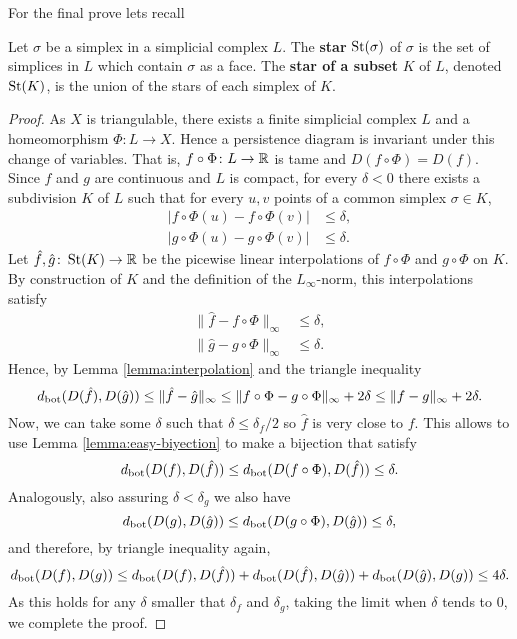 For the final prove lets recall

\begin{definition}
    Let $\sigma $ be a simplex in a simplicial complex $ L $. The {\bf star} $ \operatorname{St}(\sigma) $ of $ \sigma $ is the set of simplices in $ L $ which contain $ \sigma $ as a face. The {\bf star of a subset} $ K $ of $ L $, denoted $ \operatorname{St}(K) $, is the union of the stars of each simplex of $ K $.
\end{definition}

\Main*
\begin{proof}
    As $ X $ is triangulable, there exists a finite simplicial complex $ L $ and a homeomorphism $ \Phi\colon L \to X $. Hence a persistence diagram is invariant under this change of variables. That is, $ f \circ \Phi\colon L \to \mathbb R $ is tame and $ D(f \circ \Phi) = D(f) $. Since $ f $ and $ g $ are continuous and $ L $ is compact, for every $ \delta < 0 $ there exists a subdivision $ K $ of $ L $ such that for every $ u, v $ points of a common simplex $ \sigma \in K $, 
    \begin{align}
        |f \circ \Phi (u) - f \circ \Phi(v)| &\leq \delta, \\
        |g \circ \Phi (u) - g \circ \Phi(v)| &\leq \delta.
    \end{align}
    Let $ \hat f, \hat g \colon \operatorname{St}(K) \to \mathbb R $ be the picewise linear interpolations of $ f \circ \Phi $ and $ g \circ \Phi $ on $ K $. By construction of $ K $ and the definition of the $ L_\infty$-norm, this interpolations satisfy
    \begin{align}
        \| \hat f - f \circ \Phi \|_\infty &\leq \delta, \\
        \| \hat g - g \circ \Phi \|_\infty &\leq \delta.
    \end{align}
    Hence, by Lemma \ref{lemma:interpolation} and the triangle inequality
    $$
        d_{\operatorname{bot}}(D(\hat f), D(\hat g)) \leq \|\hat f - \hat g \|_\infty \leq \| f \circ \Phi - g \circ \Phi \|_\infty + 2 \delta \leq \| f - g \|_\infty + 2 \delta.
    $$
    Now, we can take some $ \delta $ such that $ \delta \leq \delta_f/2 $ so $ \hat f $ is very close to $ f $. This allows to use Lemma \ref{lemma:easy-biyection} to make a bijection that satisfy
    $$
        d_{\operatorname{bot}}(D(f), D(\hat f)) \leq d_{\operatorname{bot}}(D(f \circ \Phi), D(\hat f)) \leq \delta.
    $$
    Analogously, also assuring $ \delta < \delta_g $ we also have
    $$
        d_{\operatorname{bot}}(D(g), D(\hat g)) \leq d_{\operatorname{bot}}(D(g \circ \Phi), D(\hat g)) \leq \delta,
    $$
    and therefore, by triangle inequality again,
    $$
        d_{\operatorname{bot}}(D(f), D(g)) \leq d_{\operatorname{bot}}(D(f), D(\hat f)) + d_{\operatorname{bot}}(D(\hat f), D(\hat g)) + d_{\operatorname{bot}}(D(\hat g), D(g)) \leq 4 \delta.
    $$
    As this holds for any $ \delta $ smaller that $ \delta_f $ and $ \delta_g $, taking the limit when $ \delta $ tends to $ 0 $, we complete the proof.
\end{proof}